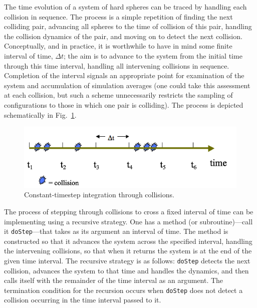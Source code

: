 \documentclass[9pt,bestpractices]{molsim}
\begin{document}
The time evolution of a system of hard spheres can be traced by handling
each collision in sequence. The process is a simple repetition of
finding the next colliding pair, advancing all spheres to the time of
collision of this pair, handling the collision dynamics of the pair, and
moving on to detect the next collision. Conceptually, and in practice,
it is worthwhile to have in mind some finite interval of time, $\Delta t$; the
aim is to advance to the system from the initial time through this time
interval, handling all intervening collisions in sequence. Completion of
the interval signals an appropriate point for examination of the system
and accumulation of simulation averages (one could take this assessment at
each collision, but such a scheme unnecessarily restricts the sampling
of configurations to those in which one pair is colliding). The process
is depicted schematically in Fig.~\ref{fig:integration}.

\begin{figure}
  \centering
  \includegraphics[width=\textwidth]{HSMD_figures/image037}
  \caption{\label{fig:integration}Constant-timestep integration through collisions.}
\end{figure}

The process of stepping through collisions to cross a fixed interval of
time can be implementing using a recursive strategy. One has a method
(or subroutine)---call it \texttt{doStep}---that takes as its argument an
interval of time. The method is constructed so that it advances the
system across the specified interval, handling the intervening
collisions, so that when it returns the system is at the end of the
given time interval. The recursive strategy is as follows: \texttt{doStep}
detects the next collision, advances the system to that time and handles
the dynamics, and then calls itself with the remainder of the time
interval as an argument. The termination condition for the recursion
occurs when \texttt{doStep} does not detect a collision occurring in the time
interval passed to it.

\end{document}
